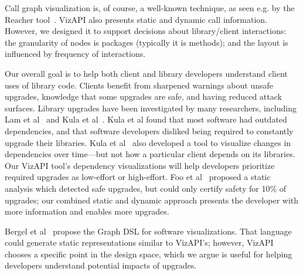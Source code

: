 Call graph visualization is, of course, a well-known technique, as seen e.g. by the Reacher tool~\cite{latoza11:_visual_call_graph}. 
VizAPI also presents static and dynamic call information. However, we designed
it to support decisions about library/client interactions: the granularity of nodes is packages (typically it is methods);
and the layout is influenced by frequency of interactions.

Our overall goal is to help both client and library developers understand
client uses of library code. Clients benefit from sharpened warnings
about unsafe upgrades, knowledge that some upgrades are safe, and
having reduced attack surfaces. Library upgrades have been
investigated by many researchers, including Lam et
al~\cite{lam20:_puttin_seman_seman_version} and Kula et al~\cite{kula18:_do_devel_updat_their_librar_depen}. Kula et al found that most
software had outdated dependencies, and that software developers disliked being required to constantly upgrade their
libraries. Kula et al~\cite{kula14:_visual_evolut_system_their_librar_depen} also developed a tool
to visualize changes in dependencies over time---but not how a particular client depends on its libraries. 
Our VizAPI tool's dependency visualizations will help developers
prioritize required upgrades as low-effort or high-effort.
Foo et al~\cite{foo18:_effic_static_check_librar_updat}
proposed a static analysis which detected safe upgrades, but could
only certify safety for 10\% of upgrades; our combined static and
dynamic approach presents the developer with more information and
enables more upgrades. 

Bergel et al~\cite{bergel14:_domain_specif_languag_visual_softw_depen_graph} propose the {\sc Graph} DSL
for software visualizations. That language could generate static representations similar to VizAPI's; however,
VizAPI chooses a specific point in the design space, which we argue is useful for helping developers understand
potential impacts of upgrades.
